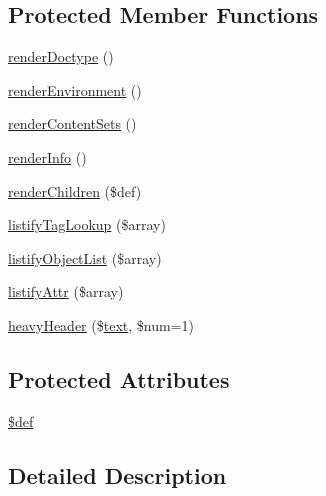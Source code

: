 \subsection*{Protected Member Functions}
\begin{DoxyCompactItemize}
\item 
\hyperlink{classHTMLPurifier__Printer__HTMLDefinition_a569b3fc433fb91762a53d140dd4d49a6}{render\+Doctype} ()
\item 
\hyperlink{classHTMLPurifier__Printer__HTMLDefinition_a044bfbbd1febb872ceb8c716c3e5453f}{render\+Environment} ()
\item 
\hyperlink{classHTMLPurifier__Printer__HTMLDefinition_acfb63ae472c19b66a9d58e5a642691dc}{render\+Content\+Sets} ()
\item 
\hyperlink{classHTMLPurifier__Printer__HTMLDefinition_a917a2ccd1535eea5059af96623f09bd5}{render\+Info} ()
\item 
\hyperlink{classHTMLPurifier__Printer__HTMLDefinition_a1e178ccff4165874902a688ec7bbbf55}{render\+Children} (\$def)
\item 
\hyperlink{classHTMLPurifier__Printer__HTMLDefinition_a14a366c91c3ec5377d075d88fd94a9f1}{listify\+Tag\+Lookup} (\$array)
\item 
\hyperlink{classHTMLPurifier__Printer__HTMLDefinition_a6341eb4dcfa1a0539b1fdc50e52ae772}{listify\+Object\+List} (\$array)
\item 
\hyperlink{classHTMLPurifier__Printer__HTMLDefinition_a647d3a070a1ae44d1284301af2be4f66}{listify\+Attr} (\$array)
\item 
\hyperlink{classHTMLPurifier__Printer__HTMLDefinition_aca380855a561d0f50d8a50299788a41c}{heavy\+Header} (\$\hyperlink{classHTMLPurifier__Printer_a7475ba2f4accc33f08f15a230f04ec19}{text}, \$num=1)
\end{DoxyCompactItemize}
\subsection*{Protected Attributes}
\begin{DoxyCompactItemize}
\item 
\hyperlink{classHTMLPurifier__Printer__HTMLDefinition_a76b1268721ebe6dc39f4a38844e67c9c}{\$def}
\end{DoxyCompactItemize}


\subsection{Detailed Description}


